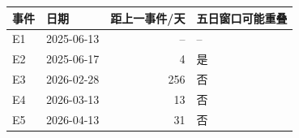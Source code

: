 \begin{tabular}{llrl}
\toprule
事件 & 日期 & 距上一事件/天 & 五日窗口可能重叠 \\
\midrule
E1 & 2025-06-13 & -- & -- \\
E2 & 2025-06-17 & 4 & 是 \\
E3 & 2026-02-28 & 256 & 否 \\
E4 & 2026-03-13 & 13 & 否 \\
E5 & 2026-04-13 & 31 & 否 \\
\bottomrule
\end{tabular}
